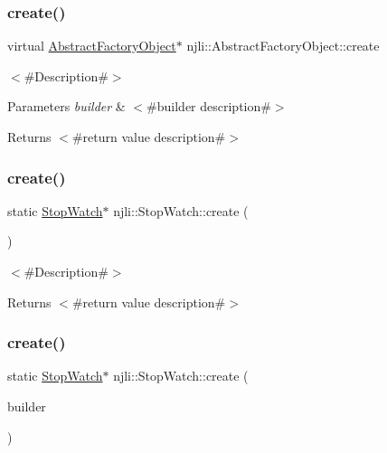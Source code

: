 \subsubsection{\texorpdfstring{create()}{create()}\hspace{0.1cm}{\footnotesize\ttfamily [1/3]}}
{\footnotesize\ttfamily virtual \mbox{\hyperlink{classnjli_1_1_abstract_factory_object}{Abstract\+Factory\+Object}}$\ast$ njli\+::\+Abstract\+Factory\+Object\+::create}

$<$\#\+Description\#$>$


\begin{DoxyParams}{Parameters}
{\em builder} & $<$\#builder description\#$>$\\
\hline
\end{DoxyParams}
\begin{DoxyReturn}{Returns}
$<$\#return value description\#$>$ 
\end{DoxyReturn}
\mbox{\label{classnjli_1_1_stop_watch_a017e60bda148ff2282d0947b2181a4f8}} 
\subsubsection{\texorpdfstring{create()}{create()}\hspace{0.1cm}{\footnotesize\ttfamily [2/3]}}
{\footnotesize\ttfamily static \mbox{\hyperlink{classnjli_1_1_stop_watch}{Stop\+Watch}}$\ast$ njli\+::\+Stop\+Watch\+::create (\begin{DoxyParamCaption}{ }\end{DoxyParamCaption})\hspace{0.3cm}{\ttfamily [static]}}

$<$\#\+Description\#$>$

\begin{DoxyReturn}{Returns}
$<$\#return value description\#$>$ 
\end{DoxyReturn}
\mbox{\label{classnjli_1_1_stop_watch_ae55b126fe41dfe7274b2bec706993738}} 
\subsubsection{\texorpdfstring{create()}{create()}\hspace{0.1cm}{\footnotesize\ttfamily [3/3]}}
{\footnotesize\ttfamily static \mbox{\hyperlink{classnjli_1_1_stop_watch}{Stop\+Watch}}$\ast$ njli\+::\+Stop\+Watch\+::create (\begin{DoxyParamCaption}\item[{const \mbox{\hyperlink{classnjli_1_1_stop_watch_builder}{Stop\+Watch\+Builder}} \&}]{builder }\end{DoxyParamCaption})\hspace{0.3cm}{\ttfamily [static]}}


